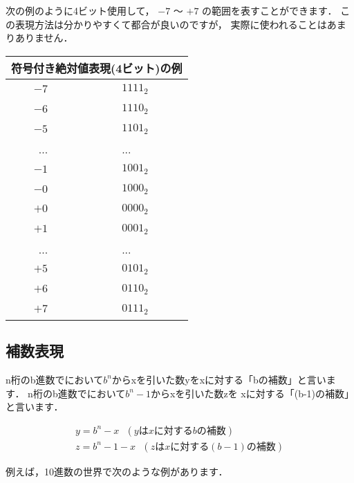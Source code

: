 次の例のように4ビット使用して，
$-7$ 〜 $+7$ の範囲を表すことができます．
この表現方法は分かりやすくて都合が良いのですが，
実際に使われることはあまりありません．

\begin{center}
\begin{tabular}{ |r c l | }
\hline
\multicolumn{3}{|c|}{\bf 符号付き絶対値表現(4ビット)の例}\\
\hline
$-7$ & ~~~~ & $1111_2$ \\
$-6$ & ~~~~ & $1110_2$ \\
$-5$ & ~~~~ & $1101_2$ \\
...  & ~~~~ & ...      \\
$-1$ & ~~~~ & $1001_2$ \\
$-0$ & ~~~~ & $1000_2$ \\
$+0$ & ~~~~ & $0000_2$ \\
$+1$ & ~~~~ & $0001_2$ \\
...  & ~~~~ & ...      \\
$+5$ & ~~~~ & $0101_2$ \\
$+6$ & ~~~~ & $0110_2$ \\
$+7$ & ~~~~ & $0111_2$ \\
\hline
\end{tabular}
\end{center}

\subsection{補数表現}
n桁のb進数でにおいて$b^n$からxを引いた数yをxに対する「bの補数」と言います．
n桁のb進数でにおいて$b^n-1$からxを引いた数zを
xに対する「(b-1)の補数」と言います．

{\small
\begin{eqnarray}
y = b^n - x ~~~ (yはxに対するbの補数) \nonumber\\
z = b^n - 1 - x ~~~ (zはxに対する(b-1)の補数) \nonumber
\end{eqnarray}
}


例えば，10進数の世界で次のような例があります．

